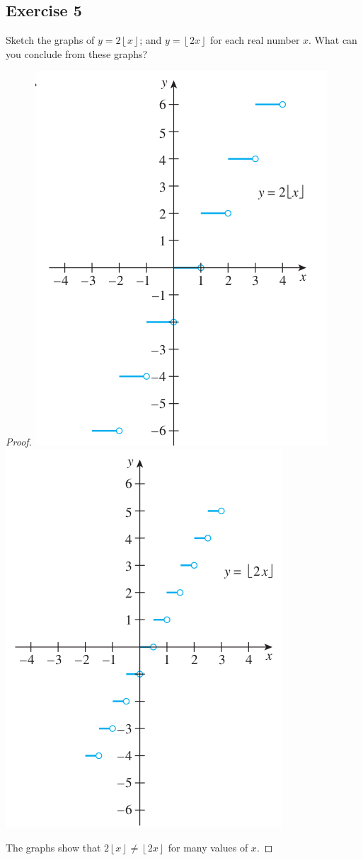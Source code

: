 \documentclass[14pt]{extarticle}
\newcommand{\floor}[1]{{\left\lfloor#1\right\rfloor}}
\begin{document}
\subsection{Exercise 5}
Sketch the graphs of \(y = 2\floor{x}\); and \(y = \floor{2x}\) for each real number \(x\). What can you conclude from 
these graphs?

\begin{proof}
\includegraphics[scale=0.5]{../images/11.1.5.a.png}
\includegraphics[scale=0.5]{../images/11.1.5.b.png}

The graphs show that \(2\floor{x} \neq \floor{2x}\) for many values of \(x\).
\end{proof}
\end{document}
